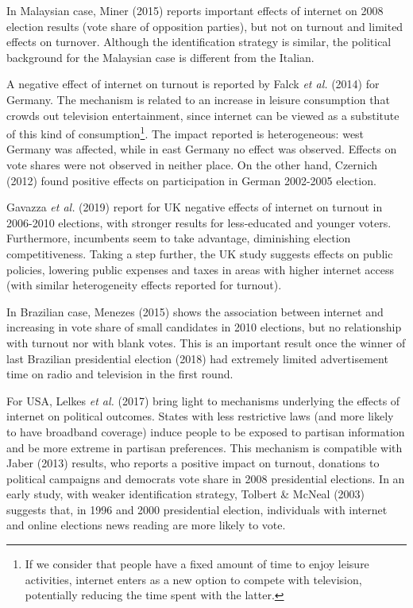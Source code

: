 \documentclass[
  12pt,
]{article}
\begin{document}
In Malaysian case, Miner (2015) reports important effects of internet on
2008 election results (vote share of opposition parties), but not on
turnout and limited effects on turnover. Although the identification
strategy is similar, the political background for the Malaysian case is
different from the Italian.

A negative effect of internet on turnout is reported by Falck \emph{et
al.} (2014) for Germany. The mechanism is related to an increase in
leisure consumption that crowds out television entertainment, since
internet can be viewed as a substitute of this kind of
consumption\footnote{If we consider that people have a fixed amount of
  time to enjoy leisure activities, internet enters as a new option to
  compete with television, potentially reducing the time spent with the
  latter.}. The impact reported is heterogeneous: west Germany was
affected, while in east Germany no effect was observed. Effects on vote
shares were not observed in neither place. On the other hand, Czernich
(2012) found positive effects on participation in German 2002-2005
election.

Gavazza \emph{et al.} (2019) report for UK negative effects of internet
on turnout in 2006-2010 elections, with stronger results for
less-educated and younger voters. Furthermore, incumbents seem to take
advantage, diminishing election competitiveness. Taking a step further,
the UK study suggests effects on public policies, lowering public
expenses and taxes in areas with higher internet access (with similar
heterogeneity effects reported for turnout).

In Brazilian case, Menezes (2015) shows the association between internet
and increasing in vote share of small candidates in 2010 elections, but
no relationship with turnout nor with blank votes. This is an important
result once the winner of last Brazilian presidential election (2018)
had extremely limited advertisement time on radio and television in the
first round.

For USA, Lelkes \emph{et al.} (2017) bring light to mechanisms
underlying the effects of internet on political outcomes. States with
less restrictive laws (and more likely to have broadband coverage)
induce people to be exposed to partisan information and be more extreme
in partisan preferences. This mechanism is compatible with Jaber (2013)
results, who reports a positive impact on turnout, donations to
political campaigns and democrats vote share in 2008 presidential
elections. In an early study, with weaker identification strategy,
Tolbert \& McNeal (2003) suggests that, in 1996 and 2000 presidential
election, individuals with internet and online elections news reading
are more likely to vote.
\end{document}
